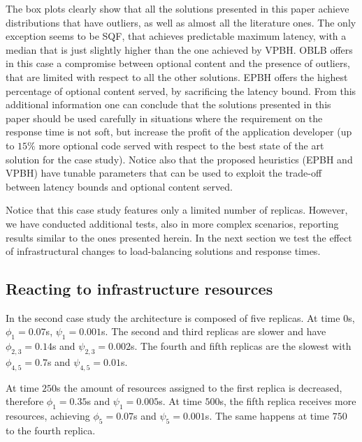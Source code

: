 The box plots clearly show that all the solutions presented in this
paper achieve distributions that have outliers, as well as almost all
the literature ones. The only exception seems to be SQF, that achieves
predictable maximum latency, with a median that is just slightly
higher than the one achieved by VPBH. OBLB offers in this case a
compromise between optional content and the presence of outliers, that
are limited with respect to all the other solutions. EPBH offers the
highest percentage of optional content served, by sacrificing the
latency bound. From this additional information one can conclude that
the solutions presented in this paper should be used carefully in
situations where the requirement on the response time is not soft, but
increase the profit of the application developer (up to $15\%$ more
optional code served with respect to the best state of the art
solution for the case study). Notice also that the proposed heuristics
(EPBH and VPBH) have tunable parameters that can be used to exploit
the trade-off between latency bounds and optional content served.

Notice that this case study features only a limited number of
replicas. However, we have conducted additional tests, also in more
complex scenarios, reporting results similar to the ones presented
herein. In the next section we test the effect of infrastructural
changes to load-balancing solutions and response times.

\subsection{Reacting to infrastructure resources}

In the second case study the architecture is composed of five
replicas. At time $0$s, $\phi_1 = 0.07$s, $\psi_1 = 0.001$s. The
second and third replicas are slower and have $\phi_{2,3} = 0.14$s and
$\psi_{2,3} = 0.002$s. The fourth and fifth replicas are the slowest
with $\phi_{4,5} = 0.7$s and $\psi_{4,5} = 0.01$s.

At time $250$s the amount of resources assigned to the first replica
is decreased, therefore $\phi_1 = 0.35$s and $\psi_1 = 0.005$s. At
time $500$s, the fifth replica receives more resources, achieving
$\phi_5 = 0.07$s and $\psi_5 = 0.001$s. The same happens at time $750$
to the fourth replica.

